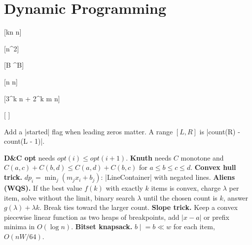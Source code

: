 \section{Dynamic Programming}

[kn \log n]

[n^2]

[B ^B]

[n \log n]

[3^k n + 2^k m \log n]

[ \cdot {} ]

{\small Add a \code|started| flag when leading zeros matter. A range $[L, R]$ is \code|count(R) - count(L - 1)|.\par}

{\small
\textbf{D\&C opt} needs $opt(i) \le opt(i + 1)$. \textbf{Knuth} needs $C$ monotone and $C(a, c) + C(b, d) \le C(a, d) + C(b, c)$ for $a \le b \le c \le d$.
\textbf{Convex hull trick.} $dp_i = \min_j (m_j x_i + b_j)$: \code|LineContainer| with negated lines.
\textbf{Aliens (WQS).} If the best value $f(k)$ with exactly $k$ items is convex, charge $\lambda$ per item, solve without the limit, binary search $\lambda$ until the chosen count is $k$, answer $g(\lambda) + \lambda k$. Break ties toward the larger count.
\textbf{Slope trick.} Keep a convex piecewise linear function as two heaps of breakpoints, add $|x - a|$ or prefix minima in $O(\log n)$.
\textbf{Bitset knapsack.} $b \mathrel{|}= b \ll w$ for each item, $O(nW/64)$.
\par}
